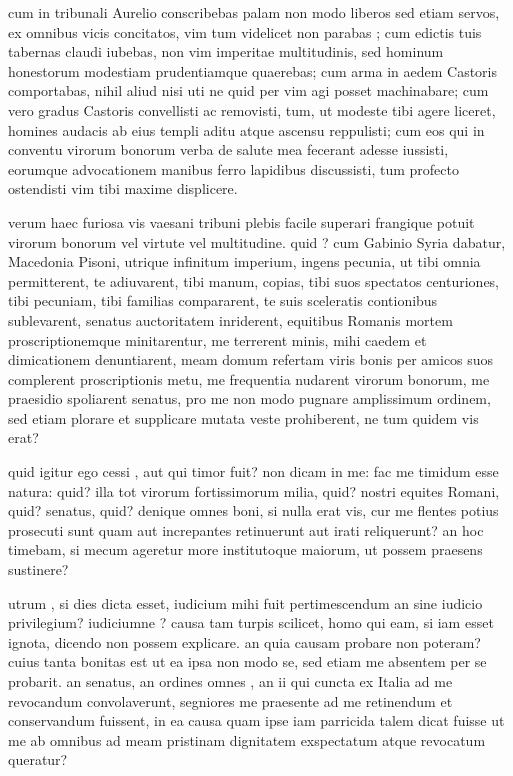  cum in tribunali Aurelio conscribebas palam non modo liberos sed etiam servos, ex omnibus vicis concitatos, vim tum videlicet non parabas ; cum edictis tuis tabernas claudi iubebas, non vim imperitae multitudinis, sed hominum honestorum modestiam prudentiamque quaerebas; cum arma in aedem Castoris comportabas, nihil aliud nisi uti ne quid per vim agi posset machinabare; cum vero gradus Castoris convellisti ac removisti, tum, ut modeste tibi agere liceret, homines audacis ab eius templi aditu atque ascensu reppulisti; cum eos qui in conventu virorum bonorum verba de salute mea fecerant adesse iussisti, eorumque advocationem manibus ferro lapidibus discussisti, tum profecto ostendisti vim tibi maxime displicere.

 verum haec furiosa vis vaesani tribuni plebis facile superari frangique potuit virorum bonorum vel virtute vel multitudine. quid ? cum Gabinio Syria dabatur, Macedonia Pisoni, utrique infinitum imperium, ingens pecunia, ut tibi omnia permitterent, te adiuvarent, tibi manum, copias, tibi suos spectatos centuriones, tibi pecuniam, tibi familias compararent, te suis sceleratis contionibus sublevarent, senatus auctoritatem inriderent, equitibus Romanis mortem proscriptionemque minitarentur, me terrerent minis, mihi caedem et dimicationem denuntiarent, meam domum refertam viris bonis per amicos suos complerent proscriptionis metu, me frequentia nudarent virorum bonorum, me praesidio spoliarent senatus, pro me non modo pugnare amplissimum ordinem, sed etiam plorare et supplicare mutata veste prohiberent, ne tum quidem vis erat?

 quid igitur ego cessi , aut qui timor fuit? non dicam in me: fac me timidum esse natura: quid? illa tot virorum fortissimorum milia, quid? nostri equites Romani, quid? senatus, quid? denique omnes boni, si nulla erat vis, cur me flentes potius prosecuti sunt quam aut increpantes retinuerunt aut irati reliquerunt? an hoc timebam, si mecum ageretur more institutoque maiorum, ut possem praesens sustinere?

 utrum , si dies dicta esset, iudicium mihi fuit pertimescendum an sine iudicio privilegium? iudiciumne ? causa tam turpis scilicet, homo qui eam, si iam esset ignota, dicendo non possem explicare. an quia causam probare non poteram? cuius tanta bonitas est ut ea ipsa non modo se, sed etiam me absentem per se probarit. an senatus, an ordines omnes , an ii qui cuncta ex Italia ad me revocandum convolaverunt, segniores me praesente ad me retinendum et conservandum fuissent, in ea causa quam ipse iam parricida talem dicat fuisse ut me ab omnibus ad meam pristinam dignitatem exspectatum atque revocatum queratur?


